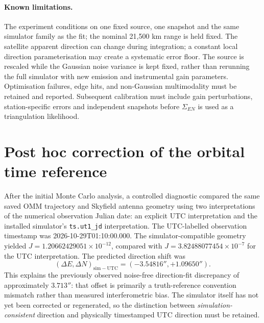 \documentclass[11pt,a4paper]{article}
\begin{document}
\paragraph{Known limitations.}
The experiment conditions on one fixed source, one snapshot and the
same simulator family as the fit; the nominal 21,500 km range is held
fixed. The satellite apparent direction can change during integration;
a constant local direction parameterisation may create a systematic
error floor. The source is rescaled while the Gaussian noise variance
is kept fixed, rather than rerunning the full simulator with new
emission and instrumental gain parameters. Optimisation failures,
edge hits, and non-Gaussian multimodality must be retained and
reported. Subsequent calibration must include gain perturbations,
station-specific errors and independent snapshots before
$\Sigma_{EN}$ is used as a triangulation likelihood.


\section{Post hoc correction of the orbital time reference}
\label{sec:utc-ut1}
After the initial Monte Carlo analysis, a controlled diagnostic
compared the same saved OMM trajectory and Skyfield antenna geometry
using two interpretations of the numerical observation Julian date:
an explicit UTC interpretation and the installed simulator's
\texttt{ts.ut1\_jd} interpretation. The UTC-labelled observation
timestamp was 2026-10-29T01:10:00.000.
The simulator-compatible geometry yielded
$J=1.20662429051\times10^{-12}$, compared with
$J=3.82488077454\times10^{-7}$ for the UTC interpretation.
The predicted direction shift was
\begin{equation}
(\Delta E,\Delta N)_{\mathrm{sim-UTC}}
=(-3.54816'',+1.09650'').
\end{equation}
This explains the previously observed noise-free direction-fit
discrepancy of approximately $3.713''$: that offset is primarily a
truth-reference convention mismatch rather than measured
interferometric bias. The simulator itself has not yet been corrected
or regenerated, so the distinction between \emph{simulation-consistent}
direction and physically timestamped UTC direction must be retained.
\end{document}
